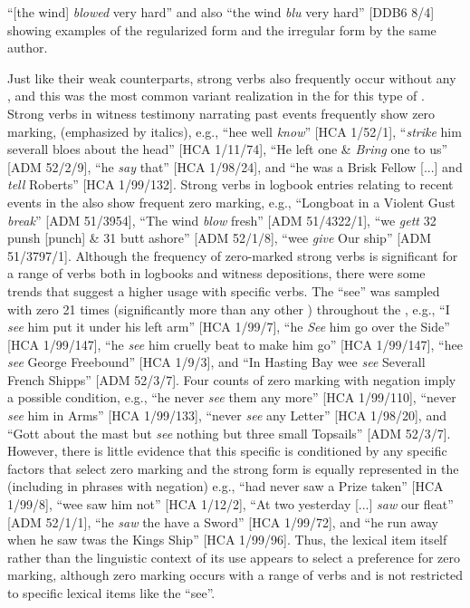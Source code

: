 “[the wind] \textit{blowed} very hard” and also “the wind \textit{blu} very hard” [DDB6 8/4] showing examples of the regularized  form and the irregular form by the same author. 

Just like their weak counterparts, strong verbs also frequently occur without any , and this was the most common variant realization in the  for this type of . Strong verbs in witness testimony narrating past events frequently show zero marking, (emphasized by italics), e.g., “hee well \textit{know}” [HCA 1/52/1], “\textit{strike} him severall bloes about the head” [HCA 1/11/74], “He left one \&  \textit{Bring} one to us” [ADM 52/2/9], “he \textit{say} that” [HCA 1/98/24], and “he was a Brisk Fellow [...] and \textit{tell} Roberts” [HCA 1/99/132]. Strong verbs in logbook entries relating to recent events in the  also show frequent zero marking, e.g., “Longboat in a Violent Gust \textit{break}” [ADM 51/3954], “The wind \textit{blow} fresh” [ADM 51/4322/1], “we \textit{gett} 32 punsh [punch] \& 31 butt ashore” [ADM 52/1/8], “wee \textit{give} Our ship” [ADM 51/3797/1]. Although the frequency of zero-marked  strong verbs is significant for a range of verbs both in logbooks and witness depositions, there were some trends that suggest a higher usage with specific verbs. The  “see” was sampled with zero  21 times (significantly more than any other ) throughout the , e.g., “I \textit{see} him put it under his left arm” [HCA 1/99/7], “he \textit{See} him go over the Side” [HCA 1/99/147], “he \textit{see} him cruelly beat to make him go” [HCA 1/99/147], “hee \textit{see} George Freebound” [HCA 1/9/3], and “In Hasting Bay wee \textit{see} Severall French Shipps” [ADM 52/3/7]. Four counts of zero marking with negation imply a possible condition, e.g., “he never \textit{see} them any more” [HCA 1/99/110], “never \textit{see} him in Arms” [HCA 1/99/133], “never \textit{see} any Letter” [HCA 1/98/20], and “Gott about the mast but \textit{see} nothing but three small Topsails” [ADM 52/3/7]. However, there is little evidence that this specific  is conditioned by any specific factors that select zero  marking and the strong  form is equally represented in the  (including in phrases with negation) e.g., “had never saw a Prize taken” [HCA 1/99/8], “wee saw him not” [HCA 1/12/2], “At two yesterday [...] \textit{saw} our fleat” [ADM 52/1/1], “he \textit{saw} the  have a Sword” [HCA 1/99/72], and “he run away when he saw twas the Kings Ship” [HCA 1/99/96]. Thus, the lexical item itself rather than the linguistic context of its use appears to select a preference for zero marking, although zero marking occurs with a range of verbs and is not restricted to specific lexical items like the  “see”.

